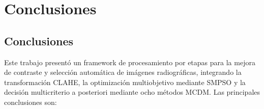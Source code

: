 \chapter{Conclusiones} %
\label{Chapter6}

\section{Conclusiones}

Este trabajo presentó un framework de procesamiento por etapas para la mejora de contraste y selección automática de imágenes radiográficas, integrando la transformación CLAHE, la optimización multiobjetivo mediante SMPSO y la decisión multicriterio a posteriori mediante ocho métodos MCDM. Las principales conclusiones son:

